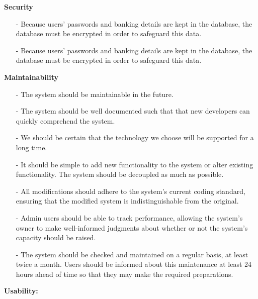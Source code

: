 \documentclass[hidelinks, 12pt, a4paper]{article}
\begin{document}
\begin{changemargin}
\begin{itemize}
             \end{itemize}
\vspace{0.5cm}
    \large{ \textbf{Security}}
         \begin{itemize}
            \item[-] Because users' passwords and banking details  are kept in the database, the database must be encrypted in order to safeguard this data. 
            \item [-] Because users' passwords and banking details  are kept in the database, the database must be encrypted in order to safeguard this data. 
        \end{itemize}
\vspace{0.5cm}    
    \large{ \textbf{Maintainability}}
         \begin{itemize}
            \item[-] The system should be maintainable in the future.
            \item [-] The system should be well documented such that that new developers can quickly comprehend  the system.
            \item[-] We should be certain that the technology we choose will be supported for a long time.
            \item [-] It should be simple to add new functionality to the system or alter existing functionality. The system should be decoupled as much as possible.
            \item[-] All modifications should adhere to the system's current coding standard, ensuring that the modified system is indistinguishable from the original.
            \item [-] Admin users should be able to track performance, allowing the system's owner to make well-informed judgments about whether or not the system's capacity should be raised.
            \item[-] The system should be checked and maintained on a regular basis, at least twice a month. Users should be informed about this maintenance at least 24 hours ahead of time so that they may make the required preparations.


        \end{itemize}
    \end{changemargin}
\vspace{0.5cm}    
    \large{ \textbf{Usability:}}
\end{document}
